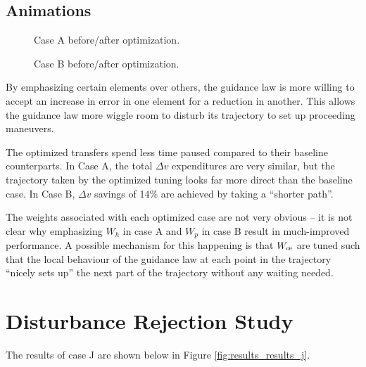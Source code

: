 \subsection{Animations}
\begin{figure}[H]
    \begin{animateinline}[controls,width=\linewidth, loop]{10}
    \end{animateinline}
    \caption{Case A before/after optimization.}
    \label{fig:benchmark_optim_anim}
\end{figure}
\begin{figure}[H]
    \begin{animateinline}[controls,width=\linewidth, loop]{10}
    \end{animateinline}
    \caption{Case B before/after optimization.}
    \label{fig:g_optim_anim}
\end{figure}

By emphasizing certain elements over others, the guidance law is more willing to accept an increase in error in one element for a reduction in another. This allows the guidance law more wiggle room to disturb its trajectory to set up proceeding maneuvers.

The optimized transfers spend less time paused compared to their baseline counterparts. In Case A, the total \(\Delta v\) expenditures are very similar, but the trajectory taken by the optimized tuning looks far more direct than the baseline case. In Case B, \(\Delta v\) savings of 14\% are achieved by taking a ``shorter path''.

The weights associated with each optimized case are not very obvious -- it is not clear why emphasizing \(W_h\) in case A and \(W_p\) in case B result in much-improved performance. A possible mechanism for this happening is that \(W_\moe\) are tuned such that the local behaviour of the guidance law at each point in the trajectory ``nicely sets up'' the next part of the trajectory without any waiting needed.
\section{Disturbance Rejection Study}
The results of case J are shown below in Figure \ref{fig:results_results_j}.

